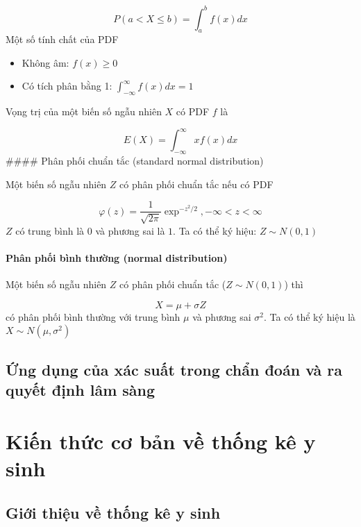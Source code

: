 \documentclass[
]{book}
\providecommand{\tightlist}{%
  \setlength{\itemsep}{0pt}\setlength{\parskip}{0pt}}
\begin{document}
\[
P(a < X \leq b) = \int^b_{a} f(x)dx
\]
Một số tính chất của PDF

\begin{itemize}
\tightlist
\item
  Không âm: \(f(x) \geq 0\)
\item
  Có tích phân bằng 1: \(\int_{-\infty}^{\infty}f(x)dx = 1\)
\end{itemize}

Vọng trị của một biến số ngẫu nhiên \(X\) có PDF \(f\) là

\[
E(X) = \int_{-\infty}^{\infty} xf(x)dx
\]
\#\#\#\# Phân phối chuẩn tắc (standard normal distribution)

Một biến số ngẫu nhiên \(Z\) có phân phối chuẩn tắc nếu có PDF

\[
\varphi(z) = \frac{1}{\sqrt{2\pi}}\exp^{-z^2/2}, -\infty < z < \infty
\]
\(Z\) có trung bình là \(0\) và phương sai là \(1\). Ta có thể ký hiệu: \(Z \sim N(0, 1)\)

\hypertarget{phuxe2n-phux1ed1i-buxecnh-thux1b0ux1eddng-normal-distribution}{%
\subsubsection{Phân phối bình thường (normal distribution)}\label{phuxe2n-phux1ed1i-buxecnh-thux1b0ux1eddng-normal-distribution}}

Một biến số ngẫu nhiên \(Z\) có phân phối chuẩn tắc (\(Z \sim N(0, 1)\)) thì

\[
X = \mu + \sigma Z
\]
có phân phối bình thường với trung bình \(\mu\) và phương sai \(\sigma^2\). Ta có thể ký hiệu là \(X \sim N(\mu, \sigma^2)\)

\hypertarget{ux1ee9ng-dux1ee5ng-cux1ee7a-xuxe1c-suux1ea5t-trong-chux1ea9n-ux111ouxe1n-vuxe0-ra-quyux1ebft-ux111ux1ecbnh-luxe2m-suxe0ng}{%
\section{Ứng dụng của xác suất trong chẩn đoán và ra quyết định lâm sàng}\label{ux1ee9ng-dux1ee5ng-cux1ee7a-xuxe1c-suux1ea5t-trong-chux1ea9n-ux111ouxe1n-vuxe0-ra-quyux1ebft-ux111ux1ecbnh-luxe2m-suxe0ng}}

\hypertarget{biostat}{%
\chapter{Kiến thức cơ bản về thống kê y sinh}\label{biostat}}

\hypertarget{giux1edbi-thiux1ec7u-vux1ec1-thux1ed1ng-kuxea-y-sinh}{%
\section{Giới thiệu về thống kê y sinh}\label{giux1edbi-thiux1ec7u-vux1ec1-thux1ed1ng-kuxea-y-sinh}}
\end{document}
